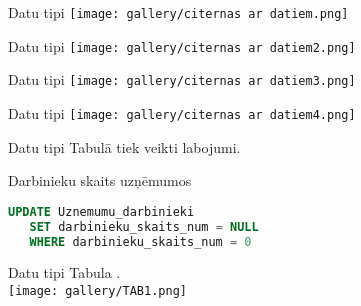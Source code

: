 \documentclass{beamer}
\begin{document}
            \begin{frame}[fragile]{Datu tipi}
     \hspace*{1cm}
     \vspace*{0.3cm}
    \texttt{[image: gallery/citernas ar datiem.png]}
    \end{frame}

                \begin{frame}[fragile]{Datu tipi}
     \hspace*{1cm}
     \vspace*{0.3cm}
    \texttt{[image: gallery/citernas ar datiem2.png]}
    \end{frame}

    \begin{frame}[fragile]{Datu tipi}
     \hspace*{1cm}
     \vspace*{0.3cm}
    \texttt{[image: gallery/citernas ar datiem3.png]}
    \end{frame}

        \begin{frame}[fragile]{Datu tipi}
     \hspace*{1cm}
     \vspace*{0.3cm}
    \texttt{[image: gallery/citernas ar datiem4.png]}
    \end{frame}

    \begin{frame}[fragile]{Datu tipi}
    \vspace{0.5cm}
    Tabulā \texttt{\color[RGB]{1, 0, 92}{Uznemumu\_darbinieki}} tiek veikti labojumi.
        \vspace{0.5cm}
        \begin{block}{Darbinieku skaits uzņēmumos}
            \begin{lstlisting}[language=SQL]
UPDATE Uznemumu_darbinieki
   SET darbinieku_skaits_num = NULL
   WHERE darbinieku_skaits_num = 0
    \end{lstlisting}
    \end{block}
    \end{frame}

    \begin{frame}[fragile]{Datu tipi}
   \vspace*{0.5cm}
    Tabula \texttt{\color[RGB]{1, 0, 92}{Uznemumu\_darbinieki}}.\\
    \vspace*{0.3cm}
    \texttt{[image: gallery/TAB1.png]}
    \end{frame}
    
\end{document}
